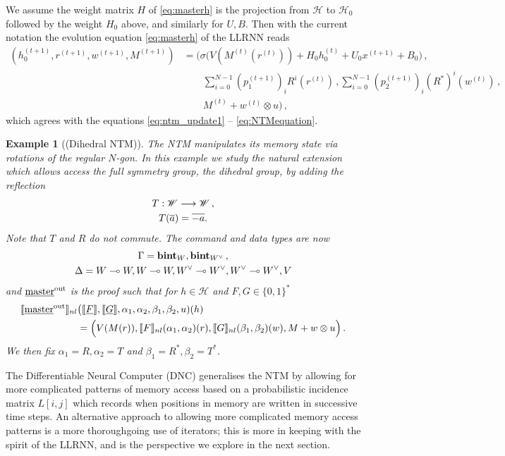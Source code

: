 \documentclass[english,letter paper,12pt,leqno]{article}
\theoremstyle{example}
\newtheorem{example}[theorem]{Example}
\numberwithin{equation}{section}
\begin{document}
We assume the weight matrix $H$ of \eqref{eq:masterh} is the projection from $\mathscr{H}$ to $\mathscr{H}_0$ followed by the weight $H_0$ above, and similarly for $U,B$. Then with the current notation the evolution equation \eqref{eq:masterh} of the LLRNN reads
\begin{align*}
(h_0^{(t+1)}, r^{(t+1)}, w^{(t+1)}, M^{(t+1)}) &= \Big( \sigma\big( V(M^{(t)}(r^{(t)})) + H_0 h_0^{(t)} + U_0 x^{(t+1)} + B_0 \big)\,,\\
&\qquad \sum_{i=0}^{N-1} (p_1^{(t+1)})_i R^i( r^{(t)} )\,, \sum_{i=0}^{N-1} (p_2^{(t+1)})_i (R^*)^i( w^{(t)} )\,,\\
&\qquad M^{(t)} + w^{(t)} \otimes u \Big)\,,
\end{align*}
which agrees with the equations \eqref{eq:ntm_update1} -- \eqref{eq:NTMequation}.

\begin{example}[(Dihedral NTM)]\label{example:dihedral} The NTM manipulates its memory state via rotations of the regular $N$-gon. In this example we study the natural extension which allows access the full symmetry group, the dihedral group, by adding the reflection
\begin{gather*}
T: \mathscr{W} \longrightarrow \mathscr{W}\,,\\
T(\overline{a}) = \overline{-a}.
\end{gather*}
Note that $T$ and $R$ do not commute. The command and data types are now
\begin{gather*}
\Gamma = \textbf{bint}_W, \textbf{bint}_{W^{\vee}}\,,\\
\Delta = W \multimap W, W \multimap W, W^{\vee} \multimap W^{\vee}, W^{\vee} \multimap W^{\vee}, V
\end{gather*}
and $\underline{\textup{master}}^{\mathrm{out}}$ is the proof such that for $h \in \mathscr{H}$ and $F,G \in \{0,1\}^*$
\begin{align*}
\llbracket \underline{\textup{master}}^{\mathrm{out}} \rrbracket_{nl}&\big( \llbracket \underline{F} \rrbracket, \llbracket \underline{G} \rrbracket, \alpha_1, \alpha_2, \beta_1, \beta_2, u )(h)\\
& = \Big(V(M(r)), \llbracket F \rrbracket_{nl}(\alpha_1,\alpha_2)(r),\llbracket G \rrbracket_{nl}(\beta_1,\beta_2)(w), M + w \otimes u\Big)\,.
\end{align*}
We then fix $\alpha_1 = R, \alpha_2 = T$ and $\beta_1 = R^*, \beta_2 = T^*$.
\end{example}

The Differentiable Neural Computer (DNC) \cite{dnc} generalises the NTM by allowing for more complicated patterns of memory access based on a probabilistic incidence matrix $L[i,j]$ which records when positions in memory are written in successive time steps. An alternative approach to allowing more complicated memory access patterns is a more thoroughgoing use of iterators; this is more in keeping with the spirit of the LLRNN, and is the perspective we explore in the next section.
\end{document}

